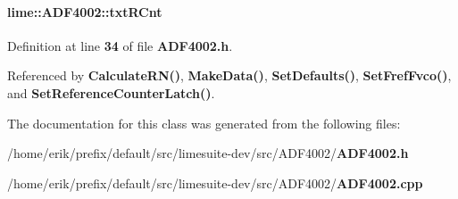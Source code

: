 \paragraph[{txt\+R\+Cnt}]{ lime\+::\+A\+D\+F4002\+::txt\+R\+Cnt}\label{classlime_1_1ADF4002_adbbd3efa813f923e1c25828aec546e1c}


Definition at line {\bf 34} of file {\bf A\+D\+F4002.\+h}.



Referenced by {\bf Calculate\+R\+N()}, {\bf Make\+Data()}, {\bf Set\+Defaults()}, {\bf Set\+Fref\+Fvco()}, and {\bf Set\+Reference\+Counter\+Latch()}.



The documentation for this class was generated from the following files\+:\begin{DoxyCompactItemize}
\item 
/home/erik/prefix/default/src/limesuite-\/dev/src/\+A\+D\+F4002/{\bf A\+D\+F4002.\+h}\item 
/home/erik/prefix/default/src/limesuite-\/dev/src/\+A\+D\+F4002/{\bf A\+D\+F4002.\+cpp}\end{DoxyCompactItemize}
